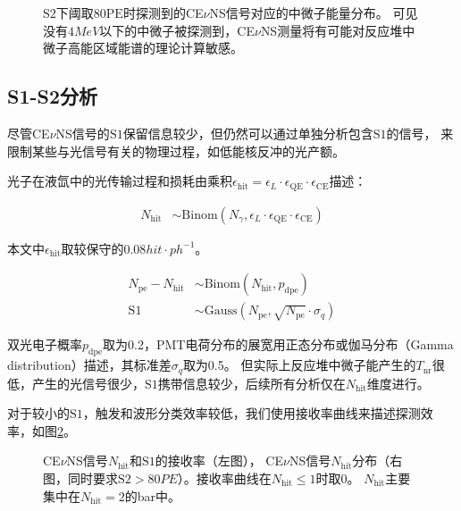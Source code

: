 \begin{figure}
    \centering
    
    \caption{\label{fig:neutrino_efficiency} $\mathrm{S2}$下阈取$80\mathrm{PE}$时探测到的CE$\nu$NS信号对应的中微子能量分布。
    可见没有$4\si{MeV}$以下的中微子被探测到，CE$\nu$NS测量将有可能对反应堆中微子高能区域能谱的理论计算敏感。}
\end{figure}

\subsection{S1-S2分析}

尽管CE$\nu$NS信号的$\mathrm{S1}$保留信息较少，但仍然可以通过单独分析包含$\mathrm{S1}$的信号，
来限制某些与光信号有关的物理过程，如低能核反冲的光产额。

光子在液氙中的光传输过程和损耗由乘积$\epsilon_\mathrm{hit}=\epsilon_L\cdot\epsilon_\mathrm{QE}\cdot\epsilon_\mathrm{CE}$描述：

\begin{align}
    \label{eq:N_hit}
    N_\mathrm{hit} &\sim \mathrm{Binom}\left(N_\gamma,\epsilon_L\cdot\epsilon_\mathrm{QE}\cdot\epsilon_\mathrm{CE}\right)
\end{align}

本文中$\epsilon_\mathrm{hit}$取较保守的$0.08\si{hit\cdot ph^{-1}}$。

\begin{align}
    \label{eq:N_peS1}
    N_\mathrm{pe} - N_\mathrm{hit} &\sim \mathrm{Binom}\left(N_\mathrm{hit},p_\mathrm{dpe}\right) \\
    \mathrm{S1} &\sim \mathrm{Gauss}\left(N_\mathrm{pe},\sqrt{N_\mathrm{pe}}\cdot\sigma_q\right)
\end{align}

双光电子概率$p_\mathrm{dpe}$取为0.2，PMT电荷分布的展宽用正态分布或伽马分布（Gamma distribution）描述，其标准差$\sigma_q$取为0.5。
但实际上反应堆中微子能产生的$T_\mathrm{nr}$很低，产生的光信号很少，$\mathrm{S1}$携带信息较少，后续所有分析仅在$N_\mathrm{hit}$维度进行。

对于较小的$\mathrm{S1}$，触发和波形分类效率较低，我们使用接收率曲线来描述探测效率，如图\ref{fig:s1_hits_pe}。

\begin{figure}
    \centering
    
    \caption{\label{fig:s1_hits_pe} CE$\nu$NS信号$N_\mathrm{hit}$和$\mathrm{S1}$的接收率（左图），
    CE$\nu$NS信号$N_\mathrm{hit}$分布（右图，同时要求$\mathrm{S2}>80\si{PE}$）。接收率曲线在$N_\mathrm{hit}\le1$时取0。
    $N_\mathrm{hit}$主要集中在$N_\mathrm{hit}=2$的bar中。}
\end{figure}


